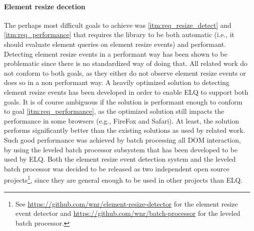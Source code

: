 \documentclass[a4paper,11pt]{kth-mag}
\begin{document}
    \paragraph{Element resize decetion}
    The perhaps most difficult goals to achieve was \ref{itm:req_resize_detect} and \ref{itm:req_performance} that requires the library to be both automatic (i.e., it should evaluate element queries on element resize events) and performant.
    Detecting element resize events in a performant way has been shown to be problematic since there is no standardized way of doing that.
    All related work do not conform to both goals, as they either do not observe element resize events or does so in a non performant way.
    A heavily optimized solution to detecting element resize events has been developed in order to enable \gls{ELQ} to support both goals.
    It is of course ambiguous if the solution is performant enough to conform to goal \ref{itm:req_performance}, as the optimized solution still impacts the performance in some browsers (e.g., FireFox and Safari).
    At least, the solution performs significantly better than the existing solutions as used by related work.
    Such good performance was achieved by batch processing all \gls{DOM} interaction, by using the leveled batch processor subsystem that has been developed to be used by \gls{ELQ}.
    Both the element resize event detection system and the leveled batch processor was decided to be released as two independent open source projects\footnote{See \url{https://github.com/wnr/element-resize-detector} for the element resize event detector and \url{https://github.com/wnr/batch-processor} for the leveled batch processor.}, since they are general enough to be used in other projects than \gls{ELQ}.
\end{document}
